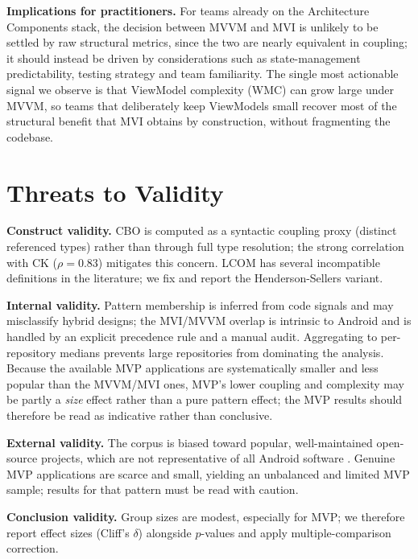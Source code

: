 \documentclass[conference]{IEEEtran}
\begin{document}
\textbf{Implications for practitioners.} For teams already on the Architecture
Components stack, the decision between MVVM and MVI is unlikely to be settled by
raw structural metrics, since the two are nearly equivalent in coupling; it
should instead be driven by considerations such as state-management
predictability, testing strategy and team familiarity. The single most actionable
signal we observe is that ViewModel complexity (WMC) can grow large under MVVM, so
teams that deliberately keep ViewModels small recover most of the structural
benefit that MVI obtains by construction, without fragmenting the codebase.

\section{Threats to Validity} \label{sec:Threats}

\textbf{Construct validity.} CBO is computed as a syntactic coupling proxy
(distinct referenced types) rather than through full type resolution; the strong
correlation with CK ($\rho=0.83$) mitigates this concern. LCOM has several
incompatible definitions in the literature; we fix and report the
Henderson-Sellers variant.

\textbf{Internal validity.} Pattern membership is inferred from code signals and
may misclassify hybrid designs; the MVI/MVVM overlap is intrinsic to Android and
is handled by an explicit precedence rule and a manual audit. Aggregating to
per-repository medians prevents large repositories from dominating the analysis.
Because the available MVP applications are systematically smaller and less popular
than the MVVM/MVI ones, MVP's lower coupling and complexity may be partly a
\emph{size} effect rather than a pure pattern effect; the MVP results should
therefore be read as indicative rather than conclusive.

\textbf{External validity.} The corpus is biased toward popular, well-maintained
open-source projects, which are not representative of all Android software
\cite{Kalliamvakou:2014}. Genuine MVP applications are scarce and small, yielding
an unbalanced and limited MVP sample; results for that pattern must be read with
caution.

\textbf{Conclusion validity.} Group sizes are modest, especially for MVP; we
therefore report effect sizes (Cliff's $\delta$) alongside $p$-values and apply
multiple-comparison correction.
\end{document}

